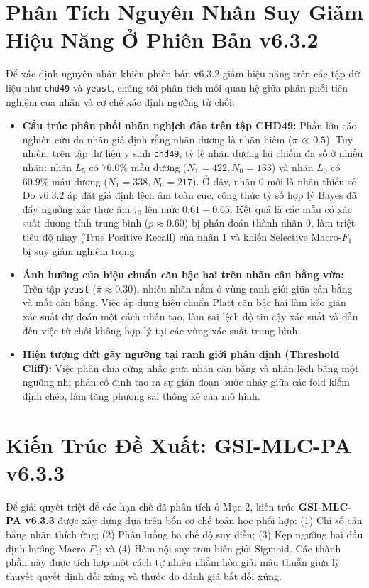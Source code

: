 \documentclass[10pt,a4paper,twoside]{article}
\begin{document}
\section{Phân Tích Nguyên Nhân Suy Giảm Hiệu Năng Ở Phiên Bản v6.3.2}
Để xác định nguyên nhân khiến phiên bản v6.3.2 giảm hiệu năng trên các tập dữ liệu như \texttt{chd49} và \texttt{yeast}, chúng tôi phân tích mối quan hệ giữa phân phối tiên nghiệm của nhãn và cơ chế xác định ngưỡng từ chối:
\begin{itemize}[leftmargin=*]
    \item \textbf{Cấu trúc phân phối nhãn nghịch đảo trên tập CHD49:} Phần lớn các nghiên cứu đa nhãn giả định rằng nhãn dương là nhãn hiếm ($\pi \ll 0.5$). Tuy nhiên, trên tập dữ liệu y sinh \texttt{chd49}, tỷ lệ nhãn dương lại chiếm đa số ở nhiều nhãn: nhãn $L_5$ có $76.0\%$ mẫu dương ($N_1=422, N_0=133$) và nhãn $L_0$ có $60.9\%$ mẫu dương ($N_1=338, N_0=217$). Ở đây, nhãn $0$ mới là nhãn thiểu số. Do v6.3.2 áp đặt giả định lệch âm toàn cục, công thức tỷ số hợp lý Bayes đã đẩy ngưỡng xác thực âm $\tau_0$ lên mức $0.61 - 0.65$. Kết quả là các mẫu có xác suất dương tính trung bình ($p \approx 0.60$) bị phán đoán thành nhãn $0$, làm triệt tiêu độ nhạy (True Positive Recall) của nhãn $1$ và khiến Selective Macro-$F_1$ bị suy giảm nghiêm trọng.
    \item \textbf{Ảnh hưởng của hiệu chuẩn căn bậc hai trên nhãn cân bằng vừa:} Trên tập \texttt{yeast} ($\bar{\pi} \approx 0.30$), nhiều nhãn nằm ở vùng ranh giới giữa cân bằng và mất cân bằng. Việc áp dụng hiệu chuẩn Platt căn bậc hai làm kéo giãn xác suất dự đoán một cách nhân tạo, làm sai lệch độ tin cậy xác suất và dẫn đến việc từ chối không hợp lý tại các vùng xác suất trung bình.
    \item \textbf{Hiện tượng đứt gãy ngưỡng tại ranh giới phân định (Threshold Cliff):} Việc phân chia cứng nhắc giữa nhãn cân bằng và nhãn lệch bằng một ngưỡng nhị phân cố định tạo ra sự gián đoạn bước nhảy giữa các fold kiểm định chéo, làm tăng phương sai thống kê của mô hình.
\end{itemize}

\section{Kiến Trúc Đề Xuất: GSI-MLC-PA v6.3.3}
Để giải quyết triệt để các hạn chế đã phân tích ở Mục 2, kiến trúc \textbf{GSI-MLC-PA v6.3.3} được xây dựng dựa trên bốn cơ chế toán học phối hợp: (1) Chỉ số cân bằng nhãn thích ứng; (2) Phân luồng ba chế độ suy diễn; (3) Kẹp ngưỡng hai đầu định hướng Macro-$F_1$; và (4) Hàm nội suy trơn biên giới Sigmoid. Các thành phần này được tích hợp một cách tự nhiên nhằm hòa giải mâu thuẫn giữa lý thuyết quyết định đối xứng và thước đo đánh giá bất đối xứng.
\end{document}
